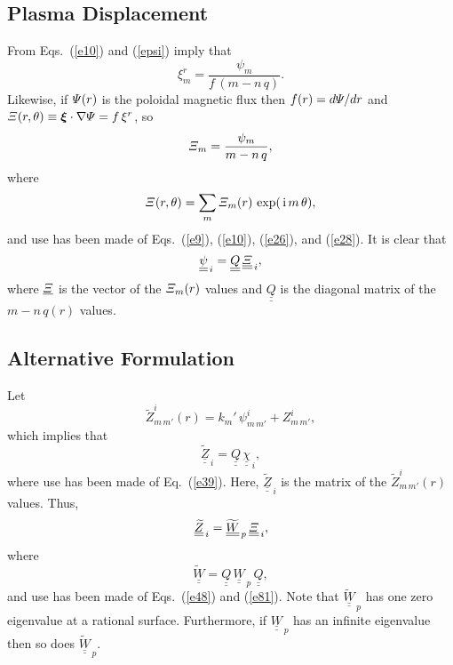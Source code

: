 \documentclass[12pt,prb,aps,notitlepage]{revtex4-1}
\newcommand{\bxi}{\mbox{\boldmath$\xi$}}
\begin{document}
\subsection{Plasma Displacement}
From Eqs.~(\ref{e10}) and (\ref{epsi}) imply that
\begin{equation}
\xi^r_m = \frac{\psi_m}{f\,(m-n\,q)}.
\end{equation}
Likewise, if ${\mit\Psi}(r)$ is the poloidal magnetic flux then $f(r)=d{\mit\Psi}/dr$ and ${\mit\Xi}(r,\theta)\equiv \bxi\cdot\nabla{\mit\Psi}= f\,\xi^r$, so
\begin{equation}
{\mit\Xi}_m = \frac{\psi_m}{m-n\,q},
\end{equation}
where
\begin{equation}
{\mit\Xi}(r,\theta)= \sum_m {\mit\Xi}_m(r)\,\exp(\,{\rm i}\,m\,\theta),
\end{equation}
and use has been made of Eqs.~(\ref{e9}), (\ref{e10}), (\ref{e26}), and (\ref{e28}). 
It is clear that
\begin{equation}\label{e81}
\underline{\underline{\psi}}_{\,i} = \underline{\underline{Q}}\,\underline{\underline{\mit\Xi}}_{\,i},
\end{equation}
where $\underline{\mit\Xi}$ is the vector of the ${\mit\Xi}_m(r)$ values and $\underline{\underline{Q}}$ is the diagonal matrix of the $m-n\,q(r)$ values. 

\subsection{Alternative Formulation}
Let
\begin{equation}
\widetilde{Z}^i_{m\,m'}(r) = k_{m}'\,\psi^i_{m\,m'}+Z_{m\,m'}^i,
\end{equation}
which implies that
\begin{equation}
\underline{\underline{\widetilde{Z}}}_{\,i} = \underline{\underline{Q}}\,\underline{\underline{\chi}}_{\,i},
\end{equation}
where use has been made of Eq.~(\ref{e39}). Here, $\underline{\underline{\widetilde{Z}}}_{\,i} $ is the matrix of the $\widetilde{Z}^i_{m\,m'}(r)$
values. 
Thus,
\begin{equation}
\underline{\underline{\widetilde{Z}}}_{\,i}= \underline{\underline{\widetilde{W}}}_{\,p}\,\underline{\underline{\mit\Xi}}_{\,i},
\end{equation}
where
\begin{equation}
\underline{\underline{\widetilde{W}}}= \underline{\underline{Q}}\,\underline{\underline{W}}_{\,p}\,\underline{\underline{Q}},
\end{equation}
and use has been made of Eqs.~(\ref{e48}) and (\ref{e81}). 
Note that $\underline{\underline{\widetilde{W}}}_{\,p}$ has one zero eigenvalue at a rational surface. Furthermore, if
$\underline{\underline{W}}_{\,p}$ has an infinite eigenvalue then so does $\underline{\underline{\widetilde{W}}}_{\,p}$.
\end{document}
